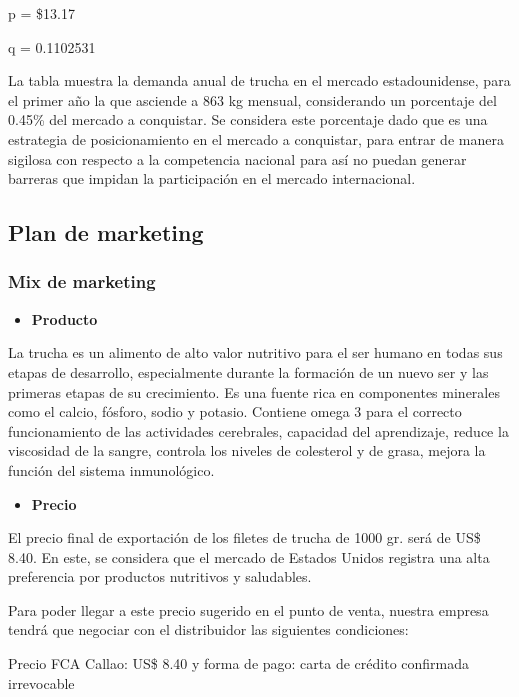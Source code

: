 \documentclass[
  stu,
  floatsintext,
  longtable,
  a4paper,
  nolmodern,
  notxfonts,
  notimes,
  12pt,
  colorlinks=true,linkcolor=blue,citecolor=blue,urlcolor=blue]{apa7}
\providecommand{\tightlist}{%
  \setlength{\itemsep}{0pt}\setlength{\parskip}{0pt}}
\begin{document}
p = \$13.17

q = 0.1102531

La tabla muestra la demanda anual de trucha en el mercado
estadounidense, para el primer año la que asciende a 863 kg mensual,
considerando un porcentaje del 0.45\% del mercado a conquistar. Se
considera este porcentaje dado que es una estrategia de posicionamiento
en el mercado a conquistar, para entrar de manera sigilosa con respecto
a la competencia nacional para así no puedan generar barreras que
impidan la participación en el mercado internacional.

\subsection{Plan de marketing}\label{plan-de-marketing}

\subsubsection{Mix de marketing}\label{mix-de-marketing}

\begin{itemize}
\tightlist
\item
  \textbf{Producto}
\end{itemize}

La trucha es un alimento de alto valor nutritivo para el ser humano en
todas sus etapas de desarrollo, especialmente durante la formación de un
nuevo ser y las primeras etapas de su crecimiento. Es una fuente rica en
componentes minerales como el calcio, fósforo, sodio y potasio. Contiene
omega 3 para el correcto funcionamiento de las actividades cerebrales,
capacidad del aprendizaje, reduce la viscosidad de la sangre, controla
los niveles de colesterol y de grasa, mejora la función del sistema
inmunológico.

\begin{itemize}
\tightlist
\item
  \textbf{Precio}
\end{itemize}

El precio final de exportación de los filetes de trucha de 1000 gr. será
de US\$ 8.40. En este, se considera que el mercado de Estados Unidos
registra una alta preferencia por productos nutritivos y saludables.

Para poder llegar a este precio sugerido en el punto de venta, nuestra
empresa tendrá que negociar con el distribuidor las siguientes
condiciones:

Precio FCA Callao: US\$ 8.40 y forma de pago: carta de crédito
confirmada irrevocable
\end{document}
